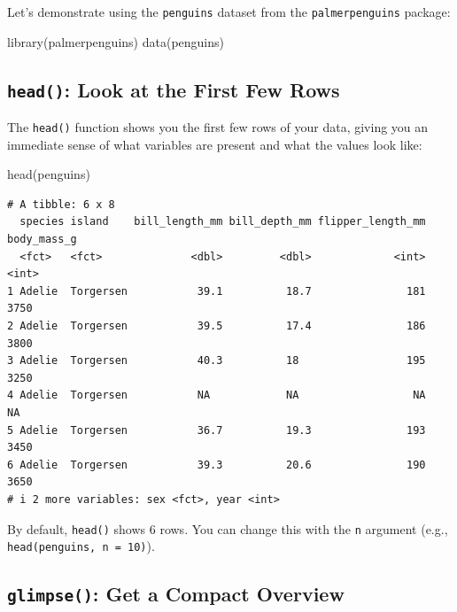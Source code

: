 \documentclass[
  letterpaper,
  DIV=11,
  numbers=noendperiod]{scrreprt}
\newenvironment{Shaded}{\begin{snugshade}}{\end{snugshade}}
\newcommand{\FunctionTok}[1]{\textcolor[rgb]{0.28,0.35,0.67}{#1}}
\newcommand{\NormalTok}[1]{\textcolor[rgb]{0.00,0.23,0.31}{#1}}
\begin{document}
Let's demonstrate using the \texttt{penguins} dataset from the
\texttt{palmerpenguins} package:

\begin{Shaded}
\begin{Highlighting}[]
\FunctionTok{library}\NormalTok{(palmerpenguins)}
\FunctionTok{data}\NormalTok{(penguins)}
\end{Highlighting}
\end{Shaded}

\subsection{\texorpdfstring{\texttt{head()}: Look at the First Few
Rows}{head(): Look at the First Few Rows}}\label{head-look-at-the-first-few-rows}

The \texttt{head()} function shows you the first few rows of your data,
giving you an immediate sense of what variables are present and what the
values look like:

\begin{Shaded}
\begin{Highlighting}[]
\FunctionTok{head}\NormalTok{(penguins)}
\end{Highlighting}
\end{Shaded}

\begin{verbatim}
# A tibble: 6 x 8
  species island    bill_length_mm bill_depth_mm flipper_length_mm body_mass_g
  <fct>   <fct>              <dbl>         <dbl>             <int>       <int>
1 Adelie  Torgersen           39.1          18.7               181        3750
2 Adelie  Torgersen           39.5          17.4               186        3800
3 Adelie  Torgersen           40.3          18                 195        3250
4 Adelie  Torgersen           NA            NA                  NA          NA
5 Adelie  Torgersen           36.7          19.3               193        3450
6 Adelie  Torgersen           39.3          20.6               190        3650
# i 2 more variables: sex <fct>, year <int>
\end{verbatim}

By default, \texttt{head()} shows 6 rows. You can change this with the
\texttt{n} argument (e.g., \texttt{head(penguins,\ n\ =\ 10)}).

\subsection{\texorpdfstring{\texttt{glimpse()}: Get a Compact
Overview}{glimpse(): Get a Compact Overview}}\label{glimpse-get-a-compact-overview}
\end{document}
